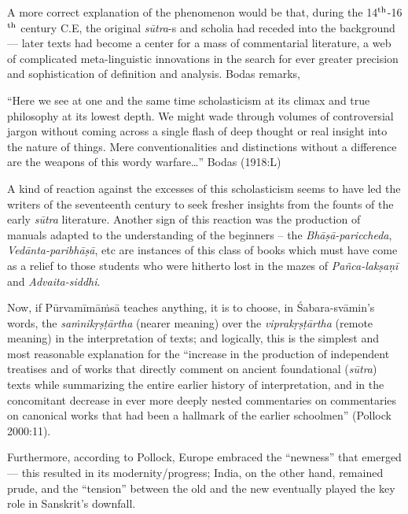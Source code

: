 A more correct explanation of the phenomenon would be that, during the 14$^{\rm th}$-16$^{\rm th}$ century C.E, the original {\sl sūtra}-s and scholia had receded into the background — later texts had become a center for a mass of commentarial literature, a web of complicated meta-linguistic innovations in the search for ever greater precision and sophistication of definition and analysis. Bodas remarks,
\begin{myquote}
“Here we see at one and the same time scholasticism at its climax and true philosophy at its lowest depth. We might wade through volumes of controversial jargon without coming across a single flash of deep thought or real insight into the nature of things. Mere conventionalities and distinctions without a difference are the weapons of this wordy warfare…” \hfill{Bodas (1918:L)}
\end{myquote}

A kind of reaction against the excesses of this scholasticism seems to have led the writers of the seventeenth century to seek fresher insights from the founts of the early {\sl sūtra} literature. Another sign of this reaction was the production of manuals adapted to the understanding of the beginners – the {\sl Bhāṣā-pariccheda}, {\sl Vedānta-paribhāṣā}, etc are instances of this class of books which must have come as a relief to those students who were hitherto lost in the mazes of {\sl Pañca-lakṣaṇī} and {\sl Advaita-siddhi}. 

Now, if Pūrvamīmāṁsā teaches anything, it is to choose, in Śabara-svāmin’s words, the {\sl saṁnikṛṣṭārtha} (nearer meaning) over the {\sl viprakṛṣṭārtha} (remote meaning) in the interpretation of texts; and logically, this is the simplest and most reasonable explanation for the “increase in the production of independent treatises and of works that directly comment on ancient foundational ({\sl sūtra}) texts while summarizing the entire earlier history of interpretation, and in the concomitant decrease in ever more deeply nested commentaries on commentaries on canonical works that had been a hallmark of the earlier schoolmen” (Pollock 2000:11).

Furthermore, according to Pollock, Europe embraced the “newness” that emerged— this resulted in its modernity/progress; India, on the other hand, remained prude, and the “tension” between the old and the new eventually played the key role in Sanskrit’s downfall.

